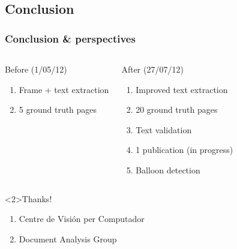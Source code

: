 \documentclass[9pt]{beamer}
\begin{document}
	\subsection[Conclusion]{Conclusion}
	\begin{frame}
			\frametitle{Conclusion & perspectives}

		\begin{columns}[c]
			\column{15em}%
			  \begin{block}{Before (1/05/12)}
				  \begin{enumerate}
					  \item Frame + text extraction\footnotemark[1]
					  \item 5 ground truth pages
				  \end{enumerate}
				\end{block}
			\column{15em} 
			  \begin{exampleblock}{After (27/07/12)}
				  \begin{enumerate}
					  \item Improved text extraction
					  \item 20 ground truth pages
					  \item Text validation
					  \item 1 publication (in progress)
					  \item Balloon detection
				  \end{enumerate}
				\end{exampleblock}
		\end{columns}

		  \begin{alertblock}<2>{Thanks!}
				  \begin{enumerate}
					  \item Centre de Visión per Computador
					  \item Document Analysis Group
				  \end{enumerate}
				\end{alertblock}
				
				
	\end{frame}
% 
		
\end{document}
